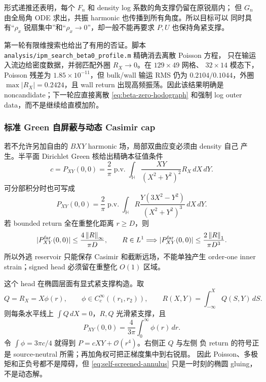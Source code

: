 \documentclass[11pt,a4paper,fontset=fandol]{ctexart}
\newcommand{\norm}[1]{\left\lVert #1\right\rVert}
\newcommand{\Order}{\mathcal O}
\begin{document}
形式递推还表明，每个 $F_n$ 和 density log 系数的角支撑仍留在原锐扇内；
但 $G_n$ 由全局角 ODE 求出，共振 harmonic 也传播到所有角度。所以目标可以
同时具有“$\rho_x$ 锐扇集中”和“$\rho_x\to0$”，却一般不能再要求 $P,U$
也保持角紧支撑。

第一轮有限维搜索也给出了有用的否证。脚本
\texttt{analysis/ipm\_search\_beta0\_profile.m} 精确消去离散 Poisson 方程，
只在输运入流边给密度数据，并弱匹配外圈 $R_X\to0$。在 $129\times49$ 网格、
$32\times14$ 模态下，Poisson 残差为 $1.85\times10^{-11}$，但 bulk/wall
输运 RMS 仍为 $0.2104/0.1044$，外圈 $\max|R_X|=0.2424$，且 wall return
出现高频振荡。因此该结果明确是 noncandidate；下一轮应直接离散
\eqref{eq:beta-zero-hodograph} 和强制 log outer data，而不是继续给直模加阶。

\subsubsection{标准 Green 自屏蔽与动态 Casimir cap}

若不允许另加自由的 $BXY$ harmonic 场，局部双曲应变必须由 density 自己
产生。半平面 Dirichlet Green 核给出精确本征值条件
\begin{equation}
 \boxed{c=P_{XY}(0,0)=\frac2\pi\operatorname{p.v.}
 \int_{\mathbb H}\frac{XY}{(X^2+Y^2)^2}R_X\,dX\,dY.}
 \label{eq:self-screened-moment}
\end{equation}
可分部积分时也可写成
\begin{equation}
 P_{XY}(0,0)=\frac2\pi\operatorname{p.v.}\int_{\mathbb H}
 R\frac{Y(3X^2-Y^2)}{(X^2+Y^2)^3}\,dX\,dY.
\end{equation}
若 bounded return 全在重整化距离 $r\ge D$，则
\begin{equation}
 |P_{XY}^{\rm far}(0,0)|\le\frac{4\norm{R}_\infty}{\pi D},
 \qquad
 R\in L^1\Longrightarrow
 |P_{XY}^{\rm far}(0,0)|\le\frac{2\norm{R}_1}{\pi D^3}.
 \label{eq:self-screened-far-bound}
\end{equation}
所以外逃 reservoir 只能保存 Casimir 和截断远场，不能单独产生 order-one
inner strain；signed head 必须留在重整化 $O(1)$ 区域。

这个 head 在椭圆层面有显式紧支撑构造。取
\begin{equation}
 Q=R_X=X\phi(r),\qquad \phi\in C_c^\infty((r_1,r_2)),
 \qquad R(X,Y)=\int_{-\infty}^XQ(S,Y)\,dS.
 \label{eq:self-screened-annulus}
\end{equation}
则每条水平线上 $\int Q\,dX=0$，$R,Q$ 光滑紧支撑，且
\begin{equation}
 \boxed{P_{XY}(0,0)=\frac4{3\pi}\int_0^\infty\phi(r)\,dr.}
 \label{eq:self-screened-annulus-strain}
\end{equation}
令 $\int\phi=3\pi c/4$ 就得到 $P=cXY+\Order(r^4)$。右侧正 $Q$ 与左侧
负 return 的符号正是 source-neutral 所需；再加角权可把正梯度集中到右锐扇。
因此 Poisson、多极矩和正负号都不是障碍，但
\eqref{eq:self-screened-annulus} 只是一时刻的椭圆 gluing，不是动态解。
\end{document}
